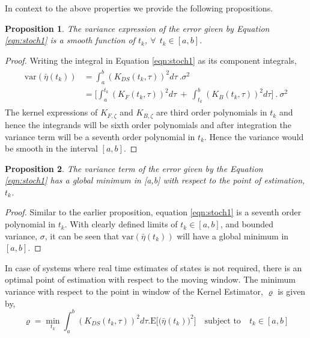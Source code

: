 \documentclass[letterpaper%
, twoside%
, 12pt%
,memoire%
, english%
,creativecommons,hyperref%
]{thETS}
\newtheorem{proposition}{Proposition}
\begin{document}
In context to the above properties we provide the following propositions.
\begin{proposition}
The variance expression of the error given by Equation \eqref{eqn:stoch1} is a smooth function of $t_k$, $\forall \ \ t_k \in [a, b]$.
\end{proposition}
\begin{proof}
Writing the integral in Equation \eqref{eqn:stoch1} as its component integrals, 
\begin{align*}
\begin{aligned}
\text{var}(\bar{\eta}(t_k)) &= \int_a^b \left(K_{DS}(t_k,\tau)\right)^2 d\tau \ . \sigma^2 \\
&= \bigg[\int_a^{t_k} \left(K_{F}(t_k,\tau)\right)^2 d\tau \ + \ \int_{t_k}^b \left(K_{B}(t_k,\tau)\right)^2 d\tau  \bigg] \ . \ \sigma^2
\end{aligned}
\end{align*}
The kernel expressions of $K_{F,\zeta}$ and $K_{B,\zeta}$ are third order polynomials in $t_k$ and hence the integrands will be sixth order polynomials and after integration the variance term will be a seventh order polynomial in $t_k$. Hence the variance would be smooth in the interval $[a,b]$.
\end{proof}

\begin{proposition}
The variance term of the error given by the Equation \eqref{eqn:stoch1} has a global minimum in [a,b] with respect to the point of estimation, $t_k$.
\end{proposition} 
\begin{proof}
Similar to the earlier proposition, equation \eqref{eqn:stoch1} is a seventh order polynomial in $t_k$. With clearly defined limits of $t_k \in [a,b]$, and bounded variance, $\sigma$, it can be seen that $\text{var}(\bar{\eta}(t_k))$ will have a global minimum in $[a,b]$.
\end{proof}
In case of systems where real time estimates of states is not required, there is an optimal point of estimation with respect to the moving window. The minimum variance with respect to the point in window of the Kernel Estimator, $\varrho$ is given by, 
\begin{equation}
	\varrho = \displaystyle{\min_{t_k}} \int_a^b \left(K_{DS}(t_k,\tau)\right)^2 d\tau . \text{E}\Big[\big( \bar{\eta}(t_k) \big)^2\Big] \quad \text{subject to} \quad  t_k \in [a,b]
\end{equation}
\end{document}
